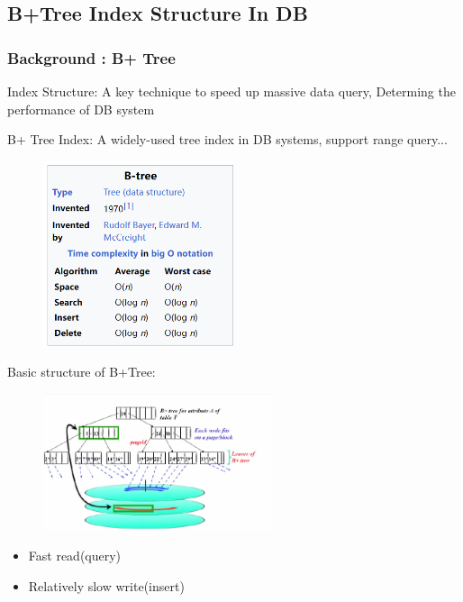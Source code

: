 \documentclass[11pt]{beamer}                                                                                                   %
\begin{document}
\subsection{B+Tree Index Structure In DB}
\begin{frame}[fragile]
	\frametitle{Background : B+ Tree}
	Index Structure: A key technique to speed up massive data query, Determing the performance of DB system
	
	B+ Tree Index: A widely-used tree index in DB systems, support range query...
			\begin{figure}[ht]%
		\centering  %
		\includegraphics[width=0.5\textwidth]{06.png}  
		
	\end{figure}
\end{frame}
\begin{frame}[t]
	Basic structure of B+Tree:
	\begin{figure}[ht]%
		\centering  %
		\includegraphics[width=0.60\textwidth]{07.png}  
		
	\end{figure}

		\begin{itemize}
		\item Fast read(query)
		\item Relatively slow write(insert)
	\end{itemize}
\end{frame}
\end{document}
